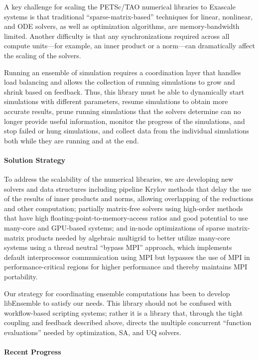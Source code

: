 A key challenge for scaling the PETSc/TAO numerical libraries to Exascale systems is that 
traditional ``sparse-matrix-based'' techniques for linear, nonlinear, and ODE solvers, as well 
as optimization algorithms, are memory-bandwidth limited.  Another difficulty is that any 
synchronizations required across all compute units---for example, an inner product or a 
norm---can dramatically affect the scaling of the solvers.

Running an ensemble of simulation requires a coordination layer that handles load balancing and
allows the collection of running simulations to grow and shrink based on feedback. Thus, this 
library must be able to dynamically start simulations with different parameters, resume 
simulations to obtain more accurate results, prune running simulations that the solvers 
determine can no longer provide useful information, monitor the progress of the simulations, 
and stop failed or hung simulations, and collect data from the individual simulations both 
while they are running and at the end.

\paragraph{Solution Strategy}

To address the scalability of the numerical libraries, we are developing new solvers and data 
structures including pipeline Krylov methods that delay the use of the results of inner products 
and norms, allowing overlapping of the reductions and other computation; partially matrix-free 
solvers using high-order methods that have high floating-point-to-memory-access ratios and
good potential to use many-core and GPU-based systems; and in-node optimizations of sparse 
matrix-matrix products needed by algebraic multigrid to better utilize many-core systems
using a thread neutral ``bypass MPI'' approach, which implements default interprocessor 
communication using MPI but bypasses the use of MPI in performance-critical regions 
for higher performance and thereby maintains MPI portability.

Our strategy for coordinating ensemble computations has been to develop libEnsemble
to satisfy our needs.  This library should not be confused with workflow-based 
scripting systems; rather it is a library that, through the tight coupling and 
feedback described above, directs the multiple concurrent ``function evaluations''
needed by optimization, SA, and UQ solvers.

\paragraph{Recent Progress}

